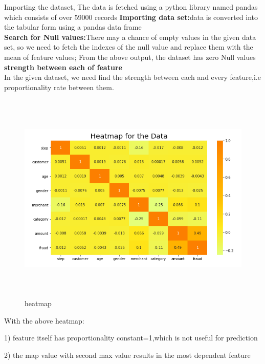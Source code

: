 \documentclass[12pt]{article}
\begin{document}
 	Importing the dataset, The data is  fetched  using a python library named pandas which consists of over 59000 records
   \textbf{ Importing data set:}data is converted into the tabular form using a pandas data frame
   \\
   \bigskip
\textbf{Search for Null values:}There may a chance of empty values in the given data set, so we need to fetch the indexes of the null value and replace them with the mean of feature values;
From the above output, the dataset has zero Null  values
\textbf{strength between each of feature}\\
In the given dataset, we need find the strength between each and 
every feature,i.e proportionality rate between them.

           \begin{figure}[htp]
    \centering
                \includegraphics[height=4in]{i12.png}
    \caption{heatmap}
    \label{fig:galaxy}
\end{figure}


With the above heatmap:
\item 1) feature itself has proportionality constant=1,which is not useful for prediction
\item 2) the map value with second max value results in the most dependent feature
\end{document}
